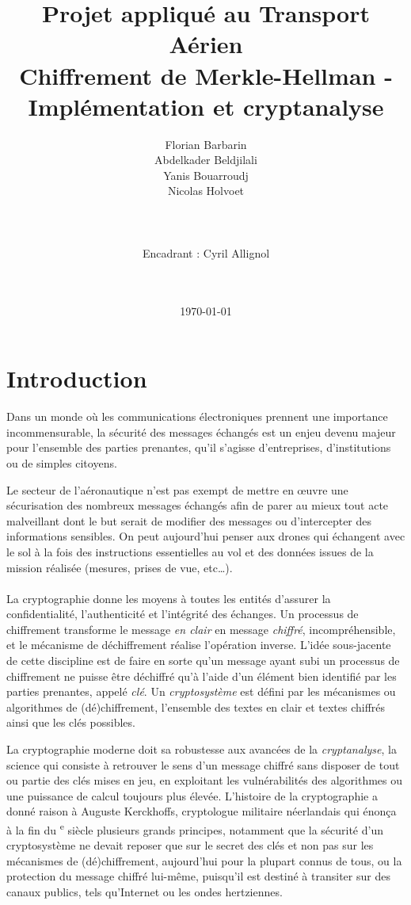 \documentclass[a4paper,10pt]{article}
\title{Projet appliqué au Transport Aérien \\ Chiffrement de Merkle-Hellman - Implémentation et cryptanalyse}
\author{Florian Barbarin \\ Abdelkader Beldjilali \\ Yanis Bouarroudj \\ Nicolas Holvoet\\ \\ \\ \\Encadrant : Cyril Allignol\\ \\ \\}
\date{\today}
\def\siecle#1{\textsc{\romannumeral #1}\textsuperscript{e}}
\begin{document}
\maketitle

\pagebreak

\tableofcontents

\pagebreak

\section*{Introduction}

Dans un monde où les communications électroniques prennent une importance incommensurable, la sécurité des messages échangés est un enjeu devenu majeur pour l'ensemble des parties prenantes, qu'il s'agisse d'entreprises, d'institutions ou de simples citoyens.

Le secteur de l'aéronautique n'est pas exempt de mettre en œuvre une sécurisation des nombreux messages échangés afin de parer au mieux tout acte malveillant dont le but serait de modifier des messages ou d'intercepter des informations sensibles. On peut aujourd'hui penser aux drones qui échangent avec le sol à la fois des instructions essentielles au vol et des données issues de la mission réalisée (mesures, prises de vue, etc\dots).

\paragraph{} La cryptographie donne les moyens à toutes les entités d'assurer la confidentialité, l'authenticité et l'intégrité des échanges. Un processus de chiffrement transforme le message \textit{en clair} en message \textit{chiffré}, incompréhensible, et le mécanisme de déchiffrement réalise l'opération inverse. L'idée sous-jacente de cette discipline est de faire en sorte qu'un message ayant subi un processus de chiffrement ne puisse être déchiffré qu'à l'aide d'un élément bien identifié par les parties prenantes, appelé \textit{clé}. Un \textit{cryptosystème} est défini par les mécanismes ou algorithmes de (dé)chiffrement, l'ensemble des textes en clair et textes chiffrés ainsi que les clés possibles. 

La cryptographie moderne doit sa robustesse aux avancées de la \textit{cryptanalyse}, la science qui consiste à retrouver le sens d'un message chiffré sans disposer de tout ou partie des clés mises en jeu, en exploitant les vulnérabilités des algorithmes ou une puissance de calcul toujours plus élevée. L'histoire de la cryptographie a donné raison à Auguste Kerckhoffs, cryptologue militaire néerlandais qui énonça à la fin du \siecle{19} siècle plusieurs grands principes, notamment que la sécurité d'un cryptosystème ne devait reposer que sur le secret des clés et non pas sur les mécanismes de (dé)chiffrement, aujourd'hui pour la plupart connus de tous, ou la protection du message chiffré lui-même, puisqu'il est destiné à transiter sur des canaux publics, tels qu'Internet ou les ondes hertziennes.
\end{document}
